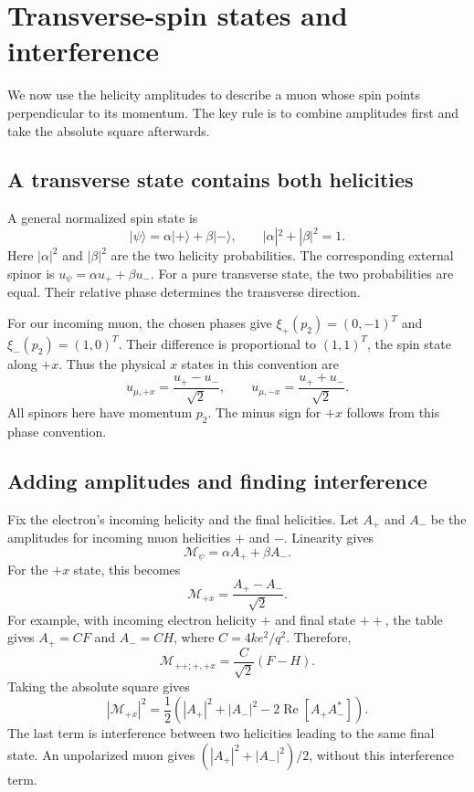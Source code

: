 \documentclass[12pt,a4paper]{article}
\numberwithin{equation}{section}
\newcommand{\M}{\mathcal M}
\begin{document}
\section{Transverse-spin states and interference}
\label{sec:transverse}
We now use the helicity amplitudes to describe a muon whose spin points
perpendicular to its momentum. The key rule is to combine amplitudes
first and take the absolute square afterwards.

\subsection{A transverse state contains both helicities}
A general normalized spin state is
\begin{equation}
 |\psi\rangle=\alpha|+\rangle+\beta|-\rangle,\qquad
 |\alpha|^2+|\beta|^2=1.
 \label{eq:helicity-superposition}
\end{equation}
Here $|\alpha|^2$ and $|\beta|^2$ are the two helicity probabilities.
The corresponding external spinor is $u_\psi=\alpha u_++\beta u_-$.
For a pure transverse state, the two probabilities are equal. Their
relative phase determines the transverse direction.

For our incoming muon, the chosen phases give
$\xi_+(p_2)=(0,-1)^T$ and $\xi_-(p_2)=(1,0)^T$.
Their difference is proportional to $(1,1)^T$, the spin state along $+x$.
Thus the physical $x$ states in this convention are
\begin{equation}
 u_{\mu,+x}=\frac{u_+-u_-}{\sqrt2},\qquad
 u_{\mu,-x}=\frac{u_++u_-}{\sqrt2}.
 \label{eq:x-spinors}
\end{equation}
All spinors here have momentum $p_2$. The minus sign for $+x$ follows from
this phase convention.

\subsection{Adding amplitudes and finding interference}
Fix the electron's incoming helicity and the final helicities. Let $A_+$
and $A_-$ be the amplitudes for incoming muon helicities $+$ and $-$.
Linearity gives
\begin{equation}
 \M_\psi=\alpha A_++\beta A_-.
\end{equation}
For the $+x$ state, this becomes
\begin{equation}
 \M_{+x}=\frac{A_+-A_-}{\sqrt2}.
 \label{eq:x-amplitude}
\end{equation}
For example, with incoming electron helicity $+$ and final state $++$,
the table gives $A_+=CF$ and $A_-=CH$, where $C=4ke^2/q^2$. Therefore,
\begin{equation}
 \M_{++;+,+x}=\frac{C}{\sqrt2}(F-H).
\end{equation}
Taking the absolute square gives
\begin{equation}
 |\M_{+x}|^2=\frac12\left(
 |A_+|^2+|A_-|^2-2\operatorname{Re}[A_+A_-^*]\right).
 \label{eq:interference}
\end{equation}
The last term is interference between two helicities leading to the same
final state. An unpolarized muon gives
$(|A_+|^2+|A_-|^2)/2$, without this interference term.
\end{document}
